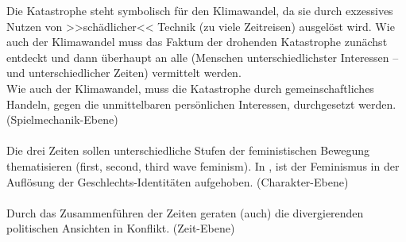 Die Katastrophe steht symbolisch für den Klimawandel, da sie durch exzessives
Nutzen von >>schädlicher<< Technik (zu viele Zeitreisen) ausgelöst wird. 
Wie auch der Klimawandel muss das Faktum der drohenden Katastrophe zunächst
entdeckt und dann überhaupt an alle (Menschen unterschiedlichster Interessen --
und unterschiedlicher Zeiten) vermittelt werden.\\
Wie auch der Klimawandel, muss die Katastrophe durch gemeinschaftliches Handeln,
gegen die unmittelbaren persönlichen Interessen, durchgesetzt werden.
(Spielmechanik-Ebene)\\\\
%
Die drei Zeiten sollen unterschiedliche Stufen der feministischen Bewegung
thematisieren (first, second, third wave feminism). In , ist der
Feminismus in der Auflösung der Geschlechts-Identitäten aufgehoben.
(Charakter-Ebene)\\\\
%
Durch das Zusammenführen der Zeiten geraten (auch) die divergierenden
politischen Ansichten in Konflikt. (Zeit-Ebene)\\\\
%
